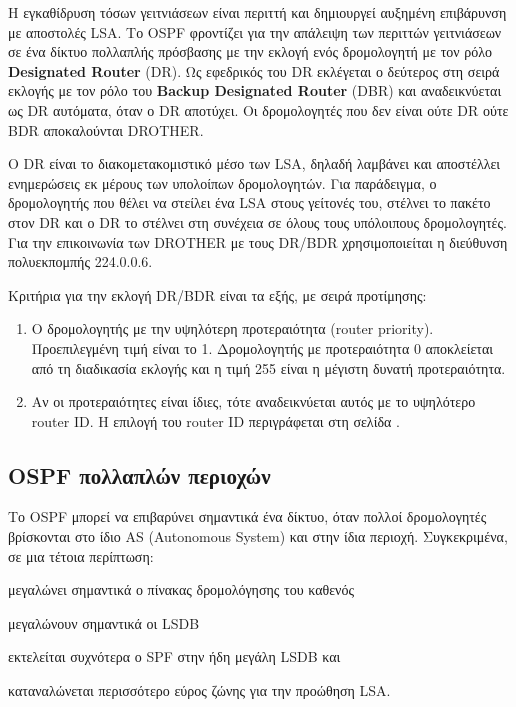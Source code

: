 \documentclass{EdipyLabs} %
\begin{document}
H εγκαθίδρυση τόσων γειτνιάσεων είναι περιττή και δημιουργεί αυξημένη επιβάρυνση με αποστολές LSA. Το OSPF φροντίζει για την απάλειψη των περιττών γειτνιάσεων σε ένα δίκτυο πολλαπλής πρόσβασης με την εκλογή ενός δρομολογητή με τον ρόλο \textbf{Designated Router} (DR). Ως εφεδρικός του DR εκλέγεται ο δεύτερος στη σειρά εκλογής με τον ρόλο του \textbf{Backup Designated Router} (DBR) και αναδεικνύεται ως DR αυτόματα, όταν ο DR αποτύχει. Οι δρομολογητές που δεν είναι ούτε DR ούτε BDR αποκαλούνται DROTHER.

O DR είναι το διακομετακομιστικό μέσο των LSΑ, δηλαδή λαμβάνει και αποστέλλει ενημερώσεις εκ μέρους των υπολοίπων δρομολογητών. Για παράδειγμα, ο δρομολογητής που θέλει να στείλει ένα LSA στους γείτονές του, στέλνει το πακέτο στον DR και ο DR το στέλνει στη συνέχεια σε όλους τους υπόλοιπους δρομολογητές. Για την επικοινωνία των DROTHER με τους DR/BDR χρησιμοποιείται η διεύθυνση πολυεκπομπής 224.0.0.6. 

Κριτήρια για την εκλογή DR/BDR είναι τα εξής, με σειρά προτίμησης:
\begin{enumerate}
	\item Ο δρομολογητής με την υψηλότερη προτεραιότητα (router priority). Προεπιλεγμένη τιμή είναι το 1. Δρομολογητής με προτεραιότητα 0 αποκλείεται από τη διαδικασία εκλογής και η τιμή 255 είναι η μέγιστη δυνατή προτεραιότητα.
	\item Αν οι προτεραιότητες είναι ίδιες, τότε αναδεικνύεται αυτός με το υψηλότερο router ID. H επιλογή του router ID περιγράφεται στη σελίδα \pageref{router-id}.
\end{enumerate}

\subsection{OSPF πολλαπλών περιοχών}\label{multiple-areas}

Το OSPF μπορεί να επιβαρύνει σημαντικά ένα δίκτυο, όταν πολλοί δρομολογητές βρίσκονται στο ίδιο AS (Autonomous System) και στην ίδια περιοχή. Συγκεκριμένα, σε μια τέτοια περίπτωση: \begin{enumerate*}[label=\alph*)] \item μεγαλώνει σημαντικά ο πίνακας δρομολόγησης του καθενός \item μεγαλώνουν σημαντικά οι LSDB \item εκτελείται συχνότερα ο SPF στην ήδη μεγάλη LSDB και \item καταναλώνεται περισσότερο εύρος ζώνης για την προώθηση LSA.
\end{enumerate*}
%
\end{document}
